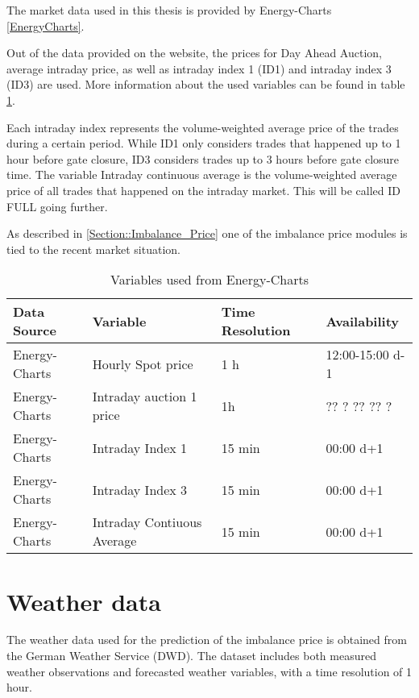 \documentclass[class=scrbook, crop=false]{standalone}
\begin{document}
The market data used in this thesis is provided by Energy-Charts \ref{EnergyCharts}.


Out of the data provided on the website, the prices for Day Ahead Auction, average intraday price, as well as intraday index 1 (ID1) and intraday index 3 (ID3) are used. 
More information about the used variables can be found in table \ref{Table::Market_Data}.

Each intraday index represents the volume-weighted average price of the trades during a certain period. 
While ID1 only considers trades that happened up to 1 hour before gate closure, ID3 considers trades up to 3 hours before gate closure time.
The variable Intraday continuous average is the volume-weighted average price of all trades that happened on the intraday market. 
This will be called ID FULL going further.

As described in \ref{Section::Imbalance_Price} one of the imbalance price modules is tied to the recent market situation.	

    
\begin{table}[]
\centering
\begin{tabular}{l|l|l|l}
 Data Source & Variable &  Time Resolution & Availability  \\\hline
 Energy-Charts & Hourly Spot price& 1 h& 12:00-15:00 d-1 \\
 Energy-Charts & Intraday auction 1 price & 1h & ?? ? ?? ?? ?\\
 Energy-Charts & Intraday Index 1 & 15 min &  00:00 d+1\\
 Energy-Charts & Intraday Index 3 & 15 min &  00:00 d+1\\
 Energy-Charts & Intraday Contiuous Average & 15 min &  00:00 d+1\\
   
\end{tabular}
\caption{Variables used from Energy-Charts}
\label{Table::Market_Data}
\end{table}

\section{Weather data}
\label{Section::Weather_Data}

The weather data used for the prediction of the imbalance price is obtained from the German Weather Service (DWD).
The dataset includes both measured weather observations and forecasted weather variables, with a time resolution of 1 hour.
\end{document}
